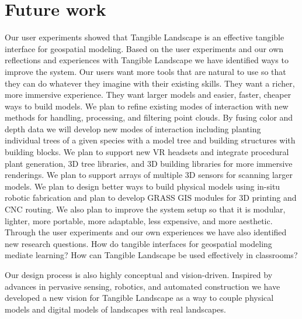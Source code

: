 \documentclass[prodmode,acmtochi]{acmsmall} %
\begin{document}
\section{Future work}
Our user experiments showed that Tangible Landscape is
an effective tangible interface for geospatial modeling. 
Based on the user experiments and 
our own reflections and experiences with Tangible Landscape
we have identified ways to improve the system.  
Our users want more tools that are natural to use 
so that they can do whatever they imagine
with their existing skills. 
They want a richer, more immersive experience. 
They want larger models and easier, faster, cheaper ways to build models.
We plan to 
refine existing modes of interaction 
with new methods for handling, processing, and filtering point clouds.
By fusing color and depth data
we will develop new modes of interaction including
planting individual trees of a given species with a model tree
and building structures with building blocks. 
We plan to support new VR headsets and integrate 
procedural plant generation, 3D tree libraries, and 3D building libraries
for more immersive renderings. 
We plan to support arrays of multiple 3D sensors
for scanning larger models.
We plan to design better ways to build physical models
using in-situ robotic fabrication
and plan to develop GRASS GIS modules 
for 3D printing and CNC routing. 
We also plan to improve the system setup
so that it is modular, lighter, more portable, more adaptable, less expensive,
and more aesthetic.
%
Through the user experiments 
and our own experiences
we have also identified new research questions.
How do tangible interfaces for geospatial modeling mediate learning?
How can Tangible Landscape be used effectively in classrooms?

Our design process is also highly conceptual and vision-driven. 
Inspired by 
advances in pervasive sensing, robotics, and automated construction
we have developed a new vision for Tangible Landscape 
as a way to couple 
physical models and digital models of landscapes 
with real landscapes.
\end{document}
